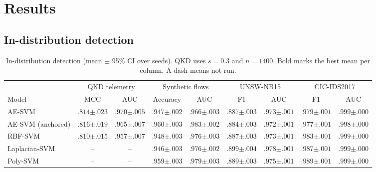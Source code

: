 \documentclass[pdflatex,sn-mathphys-num,lineno]{sn-jnl}
\theoremstyle{thmstyleone}
\begin{document}
\section{Results}
\label{sec:results}

\subsection{In-distribution detection}

\begin{table}
  \centering
  \caption{In-distribution detection (mean $\pm$ 95\% CI over seeds). QKD uses
  $s=0.3$ and $n=1400$. Bold marks the best mean per column. A dash means not run.}
  \label{tab:indist}
  \scriptsize
  \setlength{\tabcolsep}{2.6pt}
  \begin{tabular}{lcccccccc}
    \toprule
    & \multicolumn{2}{c}{QKD telemetry} & \multicolumn{2}{c}{Synthetic flows} & \multicolumn{2}{c}{UNSW-NB15} & \multicolumn{2}{c}{CIC-IDS2017} \\
    \cmidrule(lr){2-3}\cmidrule(lr){4-5}\cmidrule(lr){6-7}\cmidrule(lr){8-9}
    Model & MCC & AUC & Accuracy & AUC & F1 & AUC & F1 & AUC \\
    \midrule
    AE-SVM & $.814{\scriptstyle\pm.023}$ & $\mathbf{.970{\scriptstyle\pm.005}}$ & $.947{\scriptstyle\pm.002}$ & $.966{\scriptstyle\pm.003}$ & $.887{\scriptstyle\pm.003}$ & $.973{\scriptstyle\pm.001}$ & $.979{\scriptstyle\pm.001}$ & $.999{\scriptstyle\pm.000}$ \\
    AE-SVM (anchored) & $.816{\scriptstyle\pm.019}$ & $.965{\scriptstyle\pm.007}$ & $.960{\scriptstyle\pm.003}$ & $.983{\scriptstyle\pm.002}$ & $.884{\scriptstyle\pm.003}$ & $.972{\scriptstyle\pm.001}$ & $.977{\scriptstyle\pm.001}$ & $.998{\scriptstyle\pm.000}$ \\
    RBF-SVM & $.810{\scriptstyle\pm.015}$ & $.957{\scriptstyle\pm.007}$ & $.948{\scriptstyle\pm.003}$ & $.976{\scriptstyle\pm.003}$ & $.887{\scriptstyle\pm.003}$ & $.973{\scriptstyle\pm.001}$ & $.983{\scriptstyle\pm.001}$ & $.999{\scriptstyle\pm.000}$ \\
    Laplacian-SVM & -- & -- & $.946{\scriptstyle\pm.003}$ & $.976{\scriptstyle\pm.002}$ & $.899{\scriptstyle\pm.004}$ & $.978{\scriptstyle\pm.001}$ & $.987{\scriptstyle\pm.001}$ & $\mathbf{.999{\scriptstyle\pm.000}}$ \\
    Poly-SVM & -- & -- & $.959{\scriptstyle\pm.003}$ & $.979{\scriptstyle\pm.003}$ & $.889{\scriptstyle\pm.003}$ & $.975{\scriptstyle\pm.001}$ & $.989{\scriptstyle\pm.001}$ & $.999{\scriptstyle\pm.000}$ \\

\end{tabular}
\end{table}
\end{document}

